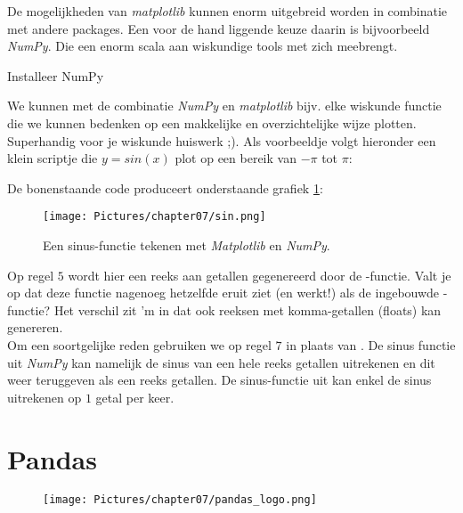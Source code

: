 De mogelijkheden van \textit{matplotlib} kunnen enorm uitgebreid worden in combinatie met andere packages. Een voor de hand liggende keuze daarin is bijvoorbeeld \textit{NumPy}. Die een enorm scala aan wiskundige tools met zich meebrengt. 

\begin{exercise}
Installeer NumPy 
\end{exercise}
We kunnen met de combinatie \textit{NumPy} en \textit{matplotlib} bijv. elke wiskunde functie die we kunnen bedenken op een makkelijke en overzichtelijke wijze plotten. Superhandig voor je wiskunde huiswerk ;). Als voorbeeldje volgt hieronder een klein scriptje die $y = sin(x)$ plot op een bereik van $-\pi$ tot $\pi$:

\newpage


De bonenstaande code produceert onderstaande grafiek \ref{fig:plot3}:
\begin{figure}[h!]
\centering\texttt{[image: Pictures/chapter07/sin.png]}
\caption{Een sinus-functie tekenen met \textit{Matplotlib} en \textit{NumPy}.}
\label{fig:plot3} 
\end{figure}

Op regel $5$ wordt hier een reeks aan getallen gegenereerd door de -functie. Valt je op dat deze functie nagenoeg hetzelfde eruit ziet (en werkt!) als de ingebouwde -functie? Het verschil zit 'm in dat  ook reeksen met komma-getallen (floats) kan genereren. \\ 
Om een soortgelijke reden gebruiken we op regel $7$  in plaats van . De sinus functie uit \textit{NumPy} kan namelijk de sinus van een hele reeks getallen uitrekenen en dit weer teruggeven als een reeks getallen. De sinus-functie uit  kan enkel de sinus uitrekenen op $1$ getal per keer.
 
\newpage

\section{Pandas}
\begin{figure}[h!]
\centering\texttt{[image: Pictures/chapter07/pandas\_logo.png]}
\label{fig:pandaslogo} %
\end{figure}

